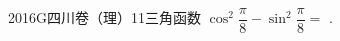 
\begin{problem}{2016}{G}{四川卷（理）}{11}{三角函数}
$\cos^2\dfrac{\pi}{8}-\sin^2\dfrac{\pi}{8}=$ \underline{\hspace{4em}}.
\end{problem}

\begin{answer}

\end{answer}

\begin{solutions}

\end{solutions}